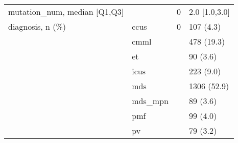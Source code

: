\begin{tabular}{llll}
mutation\_num, median [Q1,Q3] &    &      0 &     2.0 [1.0,3.0] \\
diagnosis, n (\%) & ccus &      0 &         107 (4.3) \\
                 & cmml &        &        478 (19.3) \\
                 & et &        &          90 (3.6) \\
                 & icus &        &         223 (9.0) \\
                 & mds &        &       1306 (52.9) \\
                 & mds\_mpn &        &          89 (3.6) \\
                 & pmf &        &          99 (4.0) \\
                 & pv &        &          79 (3.2) \\
\bottomrule
\end{tabular}

